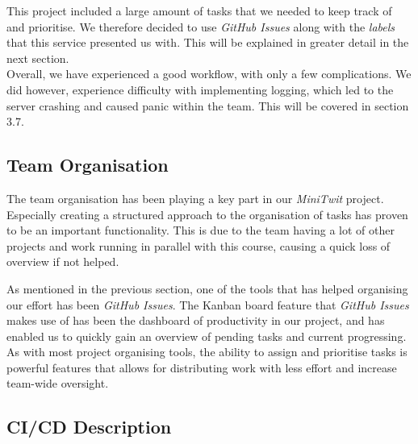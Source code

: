 This project included a large amount of tasks that we needed to keep track of and prioritise. We therefore decided to use \textit{GitHub Issues} along with the \textit{labels} that this service presented us with. This will be explained in greater detail in the next section. \\ 


Overall, we have experienced a good workflow, with only a few complications. We did however, experience difficulty with implementing logging, which led to the server crashing and caused panic within the team. This will be covered in section 3.7.


\subsection{Team Organisation}

The team organisation has been playing a key part in our \textit{MiniTwit} project. Especially creating a structured approach to the organisation of tasks has proven to be an important functionality. This is due to the team having a lot of other projects and work running in parallel with this course, causing a quick loss of overview if not helped.

As mentioned in the previous section, one of the tools that has helped organising our effort has been \textit{GitHub Issues}. The Kanban board feature that \textit{GitHub Issues} makes use of has been the dashboard of productivity in our project, and has enabled us to quickly gain an overview of pending tasks and current progressing. As with most project organising tools, the ability to assign and prioritise tasks is powerful features that allows for distributing work with less effort and increase team-wide oversight.  



\subsection{CI/CD Description}

